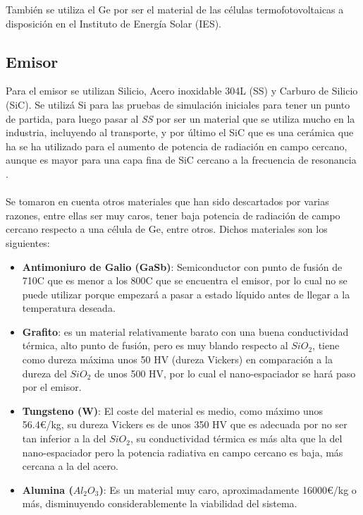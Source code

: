 También se utiliza el Ge por ser el material de las células termofotovoltaicas a disposición en el Instituto de Energía Solar (IES).
\subsection{Emisor}
Para el emisor se utilizan Silicio, Acero inoxidable 304L (SS) y Carburo de Silicio (SiC). Se utilizá Si para las pruebas de simulación iniciales para tener un punto de partida, para luego pasar al \textit{SS} por ser un material que se utiliza mucho en la industria, incluyendo al transporte, y por último el SiC que es una cerámica que ha se ha utilizado para el aumento de potencia de radiación en campo cercano, aunque es mayor para una capa fina de SiC cercano a la frecuencia de resonancia \cite{doi:Near_field_ThinFilm}.\\\\
Se tomaron en cuenta otros materiales que han sido descartados por varias razones, entre ellas ser muy caros, tener baja potencia de radiación de campo cercano respecto a una célula de Ge, entre otros. %
Dichos materiales son los siguientes:

\begin{itemize}
	\item \textbf{Antimoniuro de Galio (GaSb)}: Semiconductor con punto de fusión de 710\textdegree C que es menor a los 800\textdegree C que se encuentra el emisor, por lo cual no se puede utilizar porque empezará a pasar a estado líquido antes de llegar a la temperatura deseada.
	\item \textbf{Grafito}: es un material relativamente barato con una buena conductividad térmica, alto punto de fusión, pero es muy blando respecto al $SiO_2$, tiene como dureza máxima unos 50 HV (dureza Vickers) en comparación a la dureza del $SiO_2$ de unos 500 HV, por lo cual el nano-espaciador se hará paso por el emisor.
	\item \textbf{Tungsteno (W)}: El coste del material es medio, como máximo unos 56.4€/kg, su dureza Vickers es de unos 350 HV que es adecuada por no ser tan inferior a la del $SiO_2$, su conductividad térmica es más alta que la del nano-espaciador pero la potencia radiativa en campo cercano es baja, más cercana a la del acero.
	\item \textbf{Alumina ($Al_2O_3$)}: Es un material muy caro, aproximadamente 16000€/kg o más, disminuyendo considerablemente la viabilidad del sistema.
\end{itemize}

